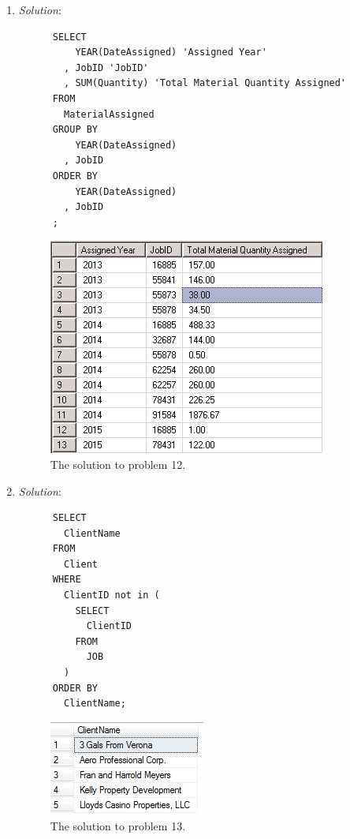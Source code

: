 \documentclass{article}
\begin{document}
\begin{enumerate}
  \newpage
  \item %

  \textit{Solution}:
  \begin{verbatim}
      SELECT
          YEAR(DateAssigned) 'Assigned Year'
        , JobID 'JobID'
        , SUM(Quantity) 'Total Material Quantity Assigned'
      FROM
        MaterialAssigned
      GROUP BY
          YEAR(DateAssigned)
        , JobID
      ORDER BY
          YEAR(DateAssigned)
        , JobID
      ;
  \end{verbatim}

  \begin{figure}[h!]
    \centering
    \includegraphics[width=.5\linewidth]{QueryResults/HW04_Problem12_query}
    \caption{The solution to problem 12.}
    \label{fig:HW04_Problem12_query}
  \end{figure}

  \newpage
  \item %
  \textit{Solution}:
  \begin{verbatim}
      SELECT
        ClientName
      FROM
        Client
      WHERE 
        ClientID not in (
          SELECT 
            ClientID 
          FROM 
            JOB
        )
      ORDER BY
        ClientName;
  \end{verbatim}

  \begin{figure}[h!]
    \centering
    \includegraphics[width=.3\linewidth]{QueryResults/HW04_Problem13_query}
    \caption{The solution to problem 13.}
    \label{fig:HW04_Problem13}
  \end{figure}


\end{enumerate}
\end{document}
